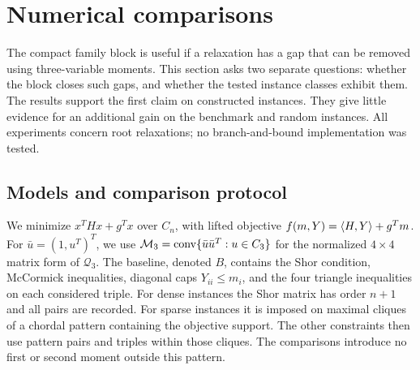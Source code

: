 \section{Numerical comparisons}
\label{comp:section}

The compact family block is useful if a relaxation has a gap that can be
removed using three-variable moments. This section asks two separate
questions: whether the block closes such gaps, and whether the tested
instance classes exhibit them. The results support the first claim on
constructed instances. They give little evidence for an additional gain
on the benchmark and random instances. All experiments concern root
relaxations; no branch-and-bound implementation was tested.

\subsection{Models and comparison protocol}
\label{comp:protocol}

We minimize $x^THx+g^Tx$ over $C_n$, with lifted objective
$f(m,Y)=\left\langle H,Y\right\rangle+g^Tm$. For $\bar u=(1,u^T)^T$, we use
$\mathcal M_3=\operatorname{conv}\{\bar u\bar u^T:u\in C_3\}$ for the normalized
$4\times4$ matrix form of $\mathcal Q_3$.
The baseline, denoted $B$, contains
the Shor condition, McCormick inequalities, diagonal caps $Y_{ii}\leq m_i$,
and the four triangle inequalities on each considered triple. For dense
instances the Shor matrix has order $n+1$ and all pairs are recorded.
For sparse instances it is imposed on maximal cliques of a chordal
pattern containing the objective support. The other constraints then use
pattern pairs and triples within those cliques. The comparisons introduce
no first or second moment outside this pattern.

